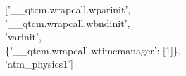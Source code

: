 
['\_\_qtcm.wrapcall.wparinit', \\
 '\_\_qtcm.wrapcall.wbndinit', \\
 'varinit', \\
 \{'\_\_qtcm.wrapcall.wtimemanager': [1]\}, \\
 'atm\_physics1']